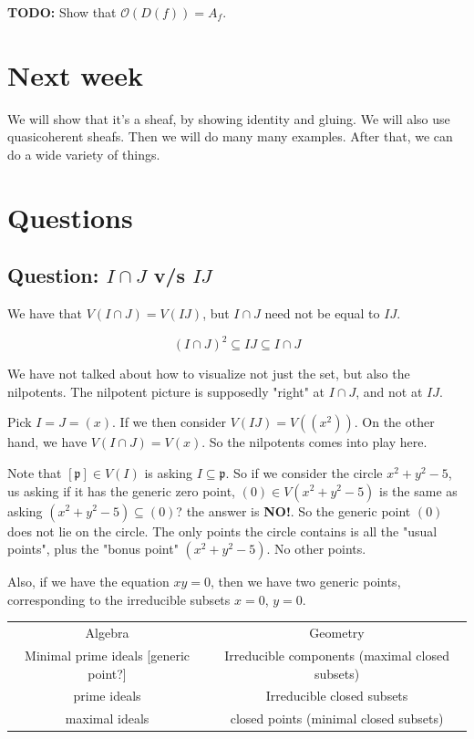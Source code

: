 \documentclass{book}
\renewcommand{\O}{\ensuremath{\mathcal{O}}}
\newcommand{\p}{\mathfrak{p}}
\theoremstyle{definition}
\begin{document}
\textbf{TODO:} Show that $\O(D(f)) = A_f$.

\section{Next week}
We will show that it's a sheaf, by showing identity and gluing. We will also
use quasicoherent sheafs. Then we will do many many examples. After that,
we can do a wide variety of things. 

\section{Questions}
\subsection{Question: $I \cap J$ v/s $IJ$}
We have that $V(I \cap J) = V(IJ)$, but $I \cap J$ need not be equal to $IJ$.

$$
(I \cap J)^2 \subseteq  IJ \subseteq I \cap J 
$$

We have not talked about how to visualize not just the set, but also the nilpotents.
The nilpotent picture is supposedly "right" at $I \cap J$, and not at $IJ$.

Pick $I = J = (x)$. If we then consider $V(IJ) = V((x^2))$. On the other hand,
we have $V(I \cap J) = V(x)$. So the nilpotents comes into play here.


Note that $[\p] \in V(I)$ is asking $I \subseteq \p$. So if we consider
the circle $x^2 + y^2 - 5$, us asking if it has the generic zero point,
$(0) \in V(x^2 + y^2 - 5)$ is the same as asking $(x^2 + y^2 - 5) \subseteq (0)$?
the answer is \textbf{NO!}. So the generic point $(0)$ does not lie on the circle.
The only points the circle contains is all the "usual points", plus the
"bonus point" $(x^2 + y^2 - 5)$. No other points.   


Also, if we have the equation $xy = 0$, then we have two generic points, corresponding
to the irreducible subsets $x = 0$, $y = 0$.


\begin{tabular}{cc}
    Algebra & Geometry \\
    Minimal prime ideals [generic point?] & Irreducible components (maximal closed subsets) \\
    prime ideals & Irreducible closed subsets \\
    maximal ideals &  closed points (minimal closed subsets) \\
\end{tabular}
\end{document}
